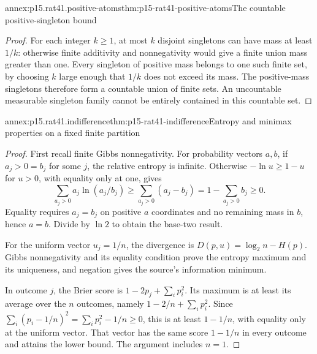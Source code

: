 \begin{annexitem}{annex:p15.rat41.positive-atoms}{thm:p15-rat41-positive-atoms}{The countable positive-singleton bound}
\begin{proof}
For each integer \(k\geq1\), at most \(k\) disjoint singletons can
have mass at least \(1/k\): otherwise finite additivity and nonnegativity
would give a finite union mass greater than one. Every singleton of
positive mass belongs to one such finite set, by choosing \(k\) large
enough that \(1/k\) does not exceed its mass. The positive-mass
singletons therefore form a countable union of finite sets. An
uncountable measurable singleton family cannot be entirely contained
in this countable set.
\end{proof}
\end{annexitem}

\begin{annexitem}{annex:p15.rat41.indifference}{thm:p15-rat41-indifference}{Entropy and minimax properties on a fixed finite partition}
\begin{proof}
First recall finite Gibbs nonnegativity. For probability vectors \(a,b\),
if \(a_j>0=b_j\) for some \(j\), the relative entropy is infinite.
Otherwise \(-\ln u\geq1-u\) for \(u>0\), with equality only at one,
gives
\[
 \sum_{a_j>0}a_j\ln(a_j/b_j)
 \geq\sum_{a_j>0}(a_j-b_j)
 =1-\sum_{a_j>0}b_j\geq0.
\]
Equality requires \(a_j=b_j\) on positive \(a\) coordinates and no
remaining mass in \(b\), hence \(a=b\). Divide by \(\ln2\) to
obtain the base-two result.

For the uniform vector \(u_j=1/n\), the divergence is
\(D(p,u)=\log_2n-H(p)\). Gibbs nonnegativity and its equality
condition prove the entropy maximum and its uniqueness, and negation
gives the source's information minimum.

In outcome \(j\), the Brier score is
\(1-2p_j+\sum_i p_i^2\). Its maximum is at least its average over
the \(n\) outcomes, namely \(1-2/n+\sum_i p_i^2\).
Since \(\sum_i(p_i-1/n)^2=\sum_i p_i^2-1/n\geq0\), this is
at least \(1-1/n\), with equality only at the uniform vector.
That vector has the same score \(1-1/n\) in every outcome and attains
the lower bound. The argument includes \(n=1\).
\end{proof}
\end{annexitem}


